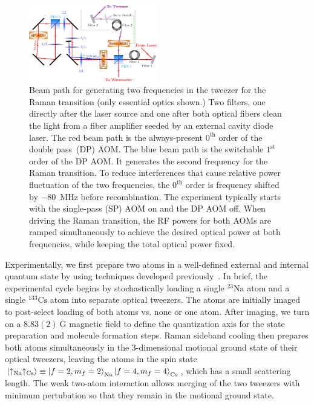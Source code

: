 \documentclass[aps,prx,twocolumn,10pt,superscriptaddress]{revtex4-2}
\newcommand{\Na}{\mathrm{Na}}
\newcommand{\Cs}{\mathrm{Cs}}
\begin{document}
\begin{figure}
  \includegraphics[width=0.5\textwidth]{raman_spectroscopy_raman_beampath.pdf}
  \caption{
    Beam path for generating two frequencies in the tweezer for the Raman transition (only essential optics shown.)
    Two filters, one directly after the laser source and one after both optical fibers clean the light from a fiber amplifier seeded by an external cavity diode laser.
    The red beam path is the always-present $0^{\mathrm{th}}$ order of the double pass~(DP) AOM.
    The blue beam path is the switchable $1^{\mathrm{st}}$ order of the DP AOM. It generates the second frequency for the Raman transition.
    To reduce interferences that cause relative power fluctuation of the two frequencies, the $0^{\mathrm{th}}$ order is frequency shifted by $-80$~MHz before recombination.
    The experiment typically starts with the single-pass (SP) AOM on and the DP AOM off.
    When driving the Raman transition, the RF powers for both AOMs are ramped simultaneously
    to achieve the desired optical power at both frequencies, while keeping the total optical power fixed.
    \label{f-beampath}
  }
\end{figure}

Experimentally, we first prepare two atoms in a well-defined external and internal quantum state
by using techniques developed previously~\cite{Liu2018, Liu2019, Wang2019}.
In brief, the experimental cycle begins by stochastically loading a single ${}^{23}\Na$ atom
and a single ${}^{133}\Cs$ atom into separate optical tweezers.
The atoms are initially imaged to post-select loading of both atoms vs.
none or one atom.
After imaging, we turn on a $8.83(2)~\mathrm{G}$ magnetic field to define the quantization axis
for the state preparation and molecule formation steps.
Raman sideband cooling then prepares both atoms simultaneously
in the 3-dimensional motional ground state of their optical tweezers, leaving the atoms in the spin state~$\ket{\uparrow_{\Na}\uparrow_{\Cs}}\equiv \ket{f=2,m_f=2}_{\Na}\ket{f=4,m_f=4}_{\Cs}$,
which has a small scattering length.
The weak two-atom interaction allows merging of the two tweezers with minimum pertubation so that they remain in the motional ground state.
\end{document}
